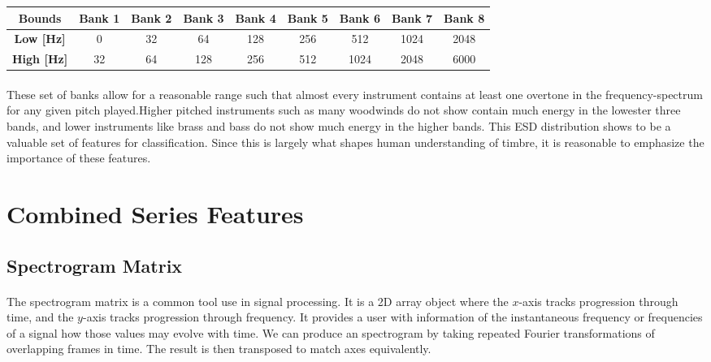\documentclass[12pt,letterpaper]{article}
\begin{document}
\begin{center}
\begin{tabular}{|c|c|c|c|c|c|c|c|c|}
\hline
\textbf{Bounds} & 	\textbf{Bank 1} & \textbf{Bank 2} & \textbf{Bank 3} & \textbf{Bank 4} & 
					\textbf{Bank 5} & \textbf{Bank 6} & \textbf{Bank 7} & \textbf{Bank 8}  \\ \hline
\textbf{Low [Hz]}	& 0		& 32	& 64 & 128 & 256 & 512 & 1024 & 2048  		\\ 	\hline
\textbf{High [Hz]}	& 32	& 64	& 128 & 256 & 512 & 1024 &  2048 & 6000 	\\	\hline
\end{tabular}
\end{center}

\paragraph*{}These set of banks allow for a reasonable range such that almost every instrument contains at least one overtone in the frequency-spectrum for any given pitch played.Higher pitched instruments such as many woodwinds do not show contain much energy in the lowester three bands, and lower instruments like brass and bass do not show much energy in the higher bands.  This ESD distribution shows to be a valuable set of features for classification. Since this is largely what shapes human understanding of timbre, it is reasonable to emphasize the importance of these features.




\section{Combined Series Features}


\subsection{Spectrogram Matrix}

\paragraph*{}The spectrogram matrix is a common tool use in signal processing. It is a 2D array object where the $x$-axis tracks progression through time, and the $y$-axis tracks progression through frequency. It provides a user with information of the instantaneous frequency or frequencies of a signal how those values may evolve with time. We can produce an spectrogram by taking repeated Fourier transformations of overlapping frames in time. The result is then transposed to match axes equivalently.
\end{document}
